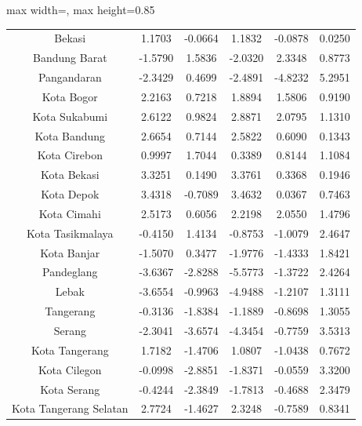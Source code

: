 \begin{table}[H]
\begin{adjustbox}{max width=\textwidth, max height=0.85\textheight}
\begin{tabular}{|c|c|c|c|c|c|}
Bekasi & 1.1703 & -0.0664 & 1.1832 & -0.0878 & 0.0250 \\
Bandung Barat & -1.5790 & 1.5836 & -2.0320 & 2.3348 & 0.8773 \\
Pangandaran & -2.3429 & 0.4699 & -2.4891 & -4.8232 & 5.2951 \\
Kota Bogor & 2.2163 & 0.7218 & 1.8894 & 1.5806 & 0.9190 \\
Kota Sukabumi & 2.6122 & 0.9824 & 2.8871 & 2.0795 & 1.1310 \\
Kota Bandung & 2.6654 & 0.7144 & 2.5822 & 0.6090 & 0.1343 \\
Kota Cirebon & 0.9997 & 1.7044 & 0.3389 & 0.8144 & 1.1084 \\
Kota Bekasi & 3.3251 & 0.1490 & 3.3761 & 0.3368 & 0.1946 \\
Kota Depok & 3.4318 & -0.7089 & 3.4632 & 0.0367 & 0.7463 \\
Kota Cimahi & 2.5173 & 0.6056 & 2.2198 & 2.0550 & 1.4796 \\
Kota Tasikmalaya & -0.4150 & 1.4134 & -0.8753 & -1.0079 & 2.4647 \\
Kota Banjar & -1.5070 & 0.3477 & -1.9776 & -1.4333 & 1.8421 \\
Pandeglang & -3.6367 & -2.8288 & -5.5773 & -1.3722 & 2.4264 \\
Lebak & -3.6554 & -0.9963 & -4.9488 & -1.2107 & 1.3111 \\
Tangerang & -0.3136 & -1.8384 & -1.1889 & -0.8698 & 1.3055 \\
Serang & -2.3041 & -3.6574 & -4.3454 & -0.7759 & 3.5313 \\
Kota Tangerang & 1.7182 & -1.4706 & 1.0807 & -1.0438 & 0.7672 \\
Kota Cilegon & -0.0998 & -2.8851 & -1.8371 & -0.0559 & 3.3200 \\
Kota Serang & -0.4244 & -2.3849 & -1.7813 & -0.4688 & 2.3479 \\
Kota Tangerang Selatan & 2.7724 & -1.4627 & 2.3248 & -0.7589 & 0.8341 \\
\hline
\end{tabular}
\end{adjustbox}
\end{table}
